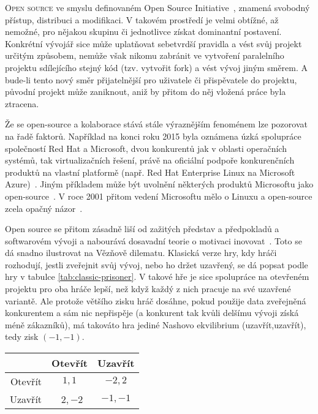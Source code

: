 \hrulefill
\begin{multicols}{2}
\lettrine[nindent=0em,lines=3]{O}{pen source} ve smyslu definovaném Open Source Initiative~\cite{OSI-2011}, znamená svobodný přístup, distribuci a modifikaci. V takovém prostředí je velmi obtížné, až nemožné, pro nějakou skupinu či jednotlivce získat dominantní postavení. Konkrétní vývojář sice může uplatňovat sebetvrdší pravidla a vést svůj projekt určitým způsobem, nemůže však nikomu zabránit ve vytvoření paralelního projektu sdílejícího stejný kód (tzv. vytvořit fork) a vést vývoj jiným směrem. A bude-li tento nový směr přijatelnější pro uživatele či přispěvatele do projektu, původní projekt může zaniknout, aniž by přitom do něj vložená práce byla ztracena.

Že se open-source a kolaborace stává stále výraznějším fenoménem lze pozorovat na řadě faktorů. Například na konci roku 2015 byla oznámena úzká spolupráce společností Red Hat a Microsoft, dvou konkurentů jak v oblasti operačních systémů, tak virtualizačních řešení, právě na oficiální podpoře konkurenčních produktů na vlastní platformě (např. Red Hat Enterprise Linux na Microsoft Azure)~\cite{redhat-microsoft}. Jiným příkladem může být uvolnění některých produktů Microsoftu jako open-source~\cite{dotnet-github}. V roce 2001 přitom vedení Microsoftu mělo o Linuxu a open-source zcela opačný názor~\cite{ballmer-linux}.

Open source se přitom zásadně liší od zažitých představ a předpokladů a softwarovém vývoji a nabourává dosavadní teorie o motivaci inovovat~\cite{promise-of-research-opensource}. Toto se dá snadno ilustrovat na Vězňově dilematu. Klasická verze hry, kdy hráči rozhodují, jestli zveřejnit svůj vývoj, nebo ho držet uzavřený, se dá popsat podle hry v tabulce \ref{tab:classic-prisoner}. V takové hře je sice spolupráce na otevřeném projektu pro oba hráče lepší, než když každý z nich pracuje na své uzavřené variantě. Ale protože většího zisku hráč dosáhne, pokud použije data zveřejněná konkurentem a sám nic nepřispěje (a konkurent tak kvůli delšímu vývoji získá méně zákazníků), má takováto hra jediné Nashovo ekvilibrium (uzavřít,uzavřít), tedy zisk $(-1,-1)$.

\begin{Figure}
\begin{center}
\begin{tabular}{r| c c}
		& Otevřít & Uzavřít \\
		\hline
	Otevřít & $1,1$ & $-2,2$ \\
	Uzavřít & $2,-2$ &\cellcolor{gray!20}  $-1,-1$ \\
\end{tabular}
\end{center}
\label{tab:classic-prisoner}
\end{Figure}


\end{multicols}
